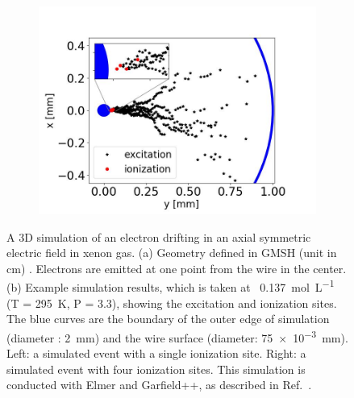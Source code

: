 \begin{figure}[!htbp]
\begin{subfigure}[b]{\figurewidth}
		\includegraphics[width=\halfwidth,clip,trim={20 0 70 0}]{Figures/GasTest/GarfieldResults/GarOneEvent101.jpg}
		\caption{}
		\label{fig:electron multiplication sim result}
	\end{subfigure}
	\caption[A 3D simulation of an electron drifting in an axially symmetric electric field in xenon gas.]{A 3D simulation of an electron drifting in an axial symmetric electric field in xenon gas. (a) Geometry defined in GMSH (unit in \si{\cm}) \cite{Geuzaine2009}. Electrons are emitted at one point from the wire in the center. (b) Example simulation results, which is taken at \opgd\ \SI{0.137}{\mole\per\liter} (T = \SI{295}{\kelvin}, P = \SI{3.3}{\bara}), showing the excitation and ionization sites. The blue curves are the boundary of the outer edge of simulation (diameter : \SI{2}{\mm}) and  the wire surface (diameter: \SI{75e-3}{\mm}). Left: a simulated event with a single ionization site. Right: a simulated event with four ionization sites. This simulation is conducted with Elmer and Garfield++, as described in Ref.~\cite{Elmergrid2000, Kotila1999, Biagi1999, Veenhof1998}.}
	\label{fig:electron multiplication sim}
\end{figure}

